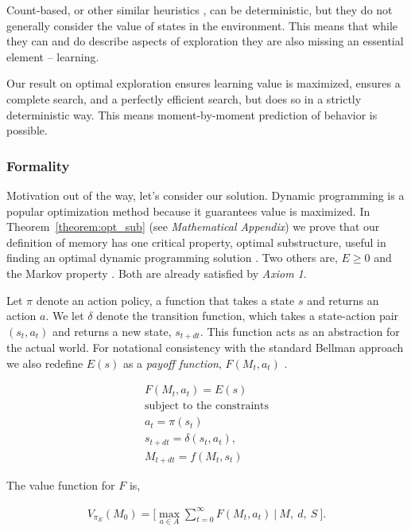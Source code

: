 \documentclass[9pt,lineno]{elife}
\begin{document}
Count-based, or other similar heuristics \cite{Bellemare2016}, can be deterministic, but they do not generally consider the value of states in the environment. This means that while they can and do describe aspects of exploration they are also missing an essential element -- learning.

Our result on optimal exploration ensures learning value is maximized, ensures a complete search, and a perfectly efficient search, but does so in a strictly deterministic way. This means moment-by-moment prediction of behavior is possible.

\subsubsection*{Formality}
Motivation out of the way, let's consider our solution. Dynamic programming is a popular optimization method because it guarantees value is maximized. In Theorem~\ref{theorem:opt_sub} (see \textit{Mathematical Appendix}) we prove that our definition of memory has one critical property, optimal substructure, useful in finding an optimal dynamic programming solution \cite{Bellmann1954,Roughgarden2019}. Two others are, $E \ge 0$ and the Markov property \cite{Bellmann1954,Roughgarden2019}. Both are already satisfied by \textit{Axiom 1}. 

Let $\pi$ denote an action policy, a function that takes a state $s$ and returns an action $a$. We let $\delta$ denote the transition function, which takes a state-action pair $(s_{t},a_t)$ and returns a new state, $s_{t+dt}$. This function acts as an abstraction for the actual world. For notational consistency with the standard Bellman approach we also redefine $E(s)$ as a \textit{payoff function}, $F(M_{t}, a_t)$ \cite{Bellmann1954}.
 
\begin{equation}
	\begin{split}\label{eq:payout} 
		F(M_{t}, a_t) = E(s)\\
		\text{subject to the constraints} \\
		a_{t} = \pi(s_t) \\
		s_{t+dt} = \delta(s_{t}, a_t),\\
		M_{t+dt} = f(M_{t}, s_{t}) 
	\end{split}
\end{equation}

\noindent The value function for $F$ is,

\begin{equation}\label{eq:V_E} 
	\begin{split}
		V_{\pi_E}(M_0) = \Big [ \max_{a \in A} \sum_{t=0}^{\infty} F(M_t, a_t) \ \Big | \ M, \ d, \ S \ \Big ]. 
	\end{split}
\end{equation}
\end{document}
